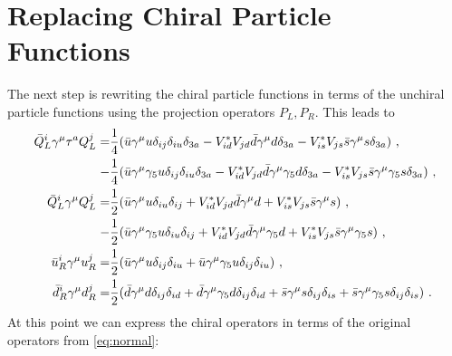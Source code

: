 \section{Replacing Chiral Particle Functions}
The next step is rewriting the chiral particle functions in terms of the unchiral particle functions using the projection operators $P_L,P_R$. This leads to
\begin{align}
	\bar{Q}_L^i\gamma^\mu\tau^a Q_L^j =&\frac{1}{4}(\bar{u}\gamma^\mu u\delta_{ij}\delta_{iu}\delta_{3a}
	- V_{id}^*V_{jd}\bar{d}\gamma^\mu d\delta_{3a} - V_{is}^*V_{js}\bar{s}\gamma^\mu s\delta_{3a}) \ , \notag \\
	-&\frac{1}{4} (\bar{u}\gamma^\mu \gamma_5u\delta_{ij}\delta_{iu}\delta_{3a} - V_{id}^*V_{jd}\bar{d}\gamma^\mu\gamma_5 d\delta_{3a} - V_{is}^*V_{js}\bar{s}\gamma^\mu\gamma_5 s\delta_{3a}) \ , \notag \\
	\bar{Q}_L^i\gamma^\mu Q_L^j =&\frac{1}{2}(
	\bar{u}\gamma^\mu u\delta_{iu}\delta_{ij} + V_{id}^*V_{jd}\bar{d}\gamma^\mu d
	+ V_{is}^*V_{js}\bar{s}\gamma^\mu s) \ , \notag \\
	-&\frac{1}{2}(\bar{u}\gamma^\mu\gamma_5u\delta_{iu}\delta_{ij} + V_{id}^*V_{jd}\bar{d}\gamma^\mu\gamma_5d + V_{is}^*V_{js}\bar{s}\gamma^\mu\gamma_5s) \ , \notag \\
	\bar{u}_R^i\gamma^\mu u_R^j =&\frac{1}{2}(\bar{u}\gamma^\mu u\delta_{ij}\delta_{iu} + \bar{u}\gamma^\mu \gamma_5u\delta_{ij}\delta_{iu}) \ , \notag \\
	\bar{d}_R^i\gamma^\mu d_R^j =&\frac{1}{2}(\bar{d}\gamma^\mu d\delta_{ij}\delta_{id} + \bar{d}\gamma^\mu\gamma_5d\delta_{ij}\delta_{id} + \bar{s}\gamma^\mu s\delta_{ij}\delta_{is} + \bar{s}\gamma^\mu \gamma_5s\delta_{ij}\delta_{is}) \ .
\end{align}
At this point we can express the chiral operators in terms of the original operators from \eqref{eq:normal}:
